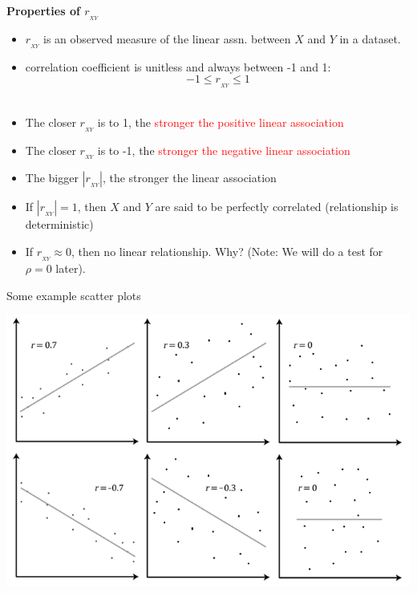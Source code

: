 \textbf{Properties of $r_{_{XY}}$}
\begin{itemize}
\item $r_{_{XY}}$ is an observed measure of the linear assn. between $X$ and $Y$ in a dataset.\\
\item correlation coefficient is unitless and always between -1 and 1:
$$ -1 \leq r_{_{XY}} \leq 1 $$~\\
\item The closer $r_{_{XY}}$ is to 1, the \textcolor{red}{stronger the positive linear association}\\
\item The closer $r_{_{XY}}$ is to -1, the \textcolor{red}{stronger the negative linear association}\\
\item The bigger $|r_{_{XY}}|$, the stronger the linear association \\
\item If $|r_{_{XY}}|=1$, then $X$ and $Y$ are said to be perfectly correlated (relationship is deterministic)\\
\item If $r_{_{XY}}\approx 0$, then no linear relationship.  Why?  (Note: We will do a test for $\rho=0$ later).
\end{itemize}
Some example scatter plots\\
\begin{flushleft}
\includegraphics[scale=0.5]{scatterexamples}
\end{flushleft}
\newpage

